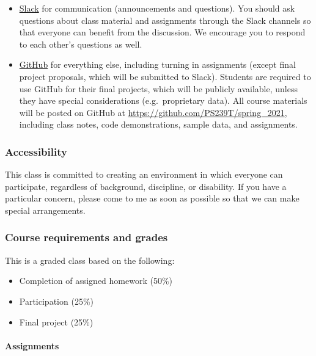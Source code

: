 \documentclass[
]{article}
\providecommand{\tightlist}{%
  \setlength{\itemsep}{0pt}\setlength{\parskip}{0pt}}
\begin{document}
\begin{itemize}
\tightlist
\item
  \href{https://slack.com/}{Slack} for communication (announcements and
  questions). You should ask questions about class material and
  assignments through the Slack channels so that everyone can benefit
  from the discussion. We encourage you to respond to each other's
  questions as well.\\
\item
  \href{https://github.com/}{GitHub} for everything else, including
  turning in assignments (except final project proposals, which will be
  submitted to Slack). Students are required to use GitHub for their
  final projects, which will be publicly available, unless they have
  special considerations (e.g.~proprietary data). All course materials
  will be posted on GitHub at
  \url{https://github.com/PS239T/spring_2021}, including class notes,
  code demonstrations, sample data, and assignments.
\end{itemize}

\hypertarget{accessibility}{%
\subsubsection{Accessibility}\label{accessibility}}

This class is committed to creating an environment in which everyone can
participate, regardless of background, discipline, or disability. If you
have a particular concern, please come to me as soon as possible so that
we can make special arrangements.

\hypertarget{course-requirements-and-grades}{%
\subsubsection{Course requirements and
grades}\label{course-requirements-and-grades}}

This is a graded class based on the following:

\begin{itemize}
\tightlist
\item
  Completion of assigned homework (50\%)
\item
  Participation (25\%)
\item
  Final project (25\%)
\end{itemize}

\hypertarget{assignments}{%
\paragraph{Assignments}\label{assignments}}
\end{document}

